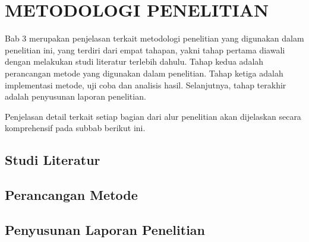 %
%
%
%
%

\chapter{METODOLOGI PENELITIAN}

Bab 3 merupakan penjelasan terkait metodologi penelitian yang digunakan
dalam penelitian ini, yang terdiri dari empat tahapan, yakni tahap pertama diawali dengan melakukan studi literatur terlebih dahulu. Tahap kedua adalah perancangan metode yang digunakan dalam penelitian. Tahap ketiga adalah implementasi metode, uji coba dan analisis hasil. Selanjutnya, tahap terakhir adalah penyusunan laporan penelitian.

Penjelasan detail terkait setiap bagian dari alur penelitian akan dijelaskan secara komprehensif pada subbab berikut ini.

\section{Studi Literatur}

\blindtext

\section{Perancangan Metode}

\blindtext

\section{Penyusunan Laporan Penelitian}

\blindtext
